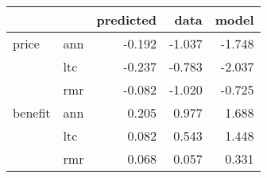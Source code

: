 \begin{tabular}{llrrr}
\toprule
        &     &  predicted &   data &  model \\
\midrule
price & ann &     -0.192 & -1.037 & -1.748 \\
        & ltc &     -0.237 & -0.783 & -2.037 \\
        & rmr &     -0.082 & -1.020 & -0.725 \\
benefit & ann &      0.205 &  0.977 &  1.688 \\
        & ltc &      0.082 &  0.543 &  1.448 \\
        & rmr &      0.068 &  0.057 &  0.331 \\
\bottomrule
\end{tabular}
